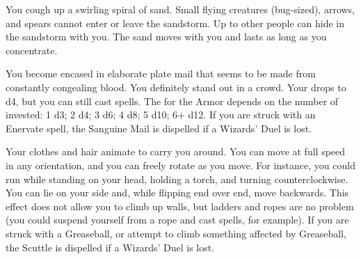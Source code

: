 {\SPELL[
  Name=Sandstorm,
  Link=wizardry-sandstorm,
  Paradigm=Elements,
  Save=N,
  Duration=Concentration,
  Counter=n/a ,
  Keywords=None,
  Target=Close
]



You cough up a swirling spiral of sand.  Small flying creatures (bug-sized),
arrows, and spears cannot enter or leave the sandstorm.  Up to  other
people can hide in the sandstorm with you.  The sand moves with you and
lasts as long as you concentrate.



\SPELL[
  Name=Sanguine Mail,
  Link=wizardry-sanguine-mail,
  Paradigm=Biomancy,
  Save=N,
  Duration=Session,
  Counter=\mylink{Enervate}{wizardry-enervate} ,
  Keywords=None,
  Target=Self
]



You become encased in elaborate plate mail that seems to be made from
constantly congealing blood.  You definitely stand out in a crowd. Your \MD
drops to d4, but you can still cast spells.  The \UD for the Armor depends
on the number of \DICE invested: 1 d3; 2 d4; 3 d6; 4 d8; 5 d10; 6+ d12.  If
you are struck with an Enervate spell, the Sanguine Mail is dispelled if a
Wizards' Duel is lost.





\SPELL[
  Name=Scuttle,
  Link=wizardry-scuttle,
  Paradigm=Biomancy,
  Save=N,
  Duration=Combat or \SUMDICE Minutes,
  Counter=\mylink{Greaseball}{wizardry-greaseball} ,
  Keywords=None,
  Target=Self
]



Your clothes and hair animate to carry you around. You can move at full
speed in any orientation, and you can freely rotate as you move. For
instance, you could run while standing on your head, holding a torch, and
turning counterclockwise. You can lie on your side and, while flipping end
over end, move backwards. This effect does not allow you to climb up walls,
but ladders and ropes are no problem (you could suspend yourself from a rope
and cast spells, for example).  If you are struck with a Greaseball, or
attempt to climb something affected by Greaseball, the Scuttle is dispelled
if a Wizards' Duel is lost.




\SPELL[
  Name=Scything Disc of Nog,
  Link=wizardry-scything-disc-of-nog,
  Paradigm=Force,
  Save=Y (half),
  Duration=0,
  Counter=n/a ,
  Keywords=None,
  Target=Nearby or Far Away Area
]



}
